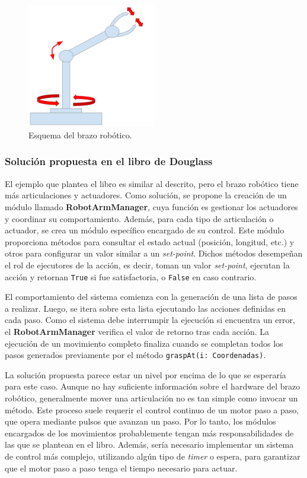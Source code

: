 \begin{figure}[h]
\caption{Esquema del brazo robótico.}
\begin{centering}
{\includegraphics[width=0.5\textwidth]{brazo2.png}\par}
\end{centering}
\end{figure}

\subsubsection*{Solución propuesta en el libro de Douglass}

El ejemplo que plantea el libro es similar al descrito, pero el brazo robótico tiene más articulaciones y actuadores. Como solución, se propone la creación de un módulo llamado \textbf{RobotArmManager}, cuya función es gestionar los actuadores y coordinar su comportamiento. Además, para cada tipo de articulación o actuador, se crea un módulo específico encargado de su control. Este módulo proporciona métodos para consultar el estado actual (posición, longitud, etc.) y otros para configurar un valor similar a un \textit{set-point}. Dichos métodos desempeñan el rol de ejecutores de la acción, es decir, toman un valor \textit{set-point}, ejecutan la acción y retornan \verb|True| si fue satisfactoria, o \verb|False| en caso contrario.

El comportamiento del sistema comienza con la generación de una lista de pasos a realizar. Luego, se itera sobre esta lista ejecutando las acciones definidas en cada paso. Como el sistema debe interrumpir la ejecución si encuentra un error, el \textbf{RobotArmManager} verifica el valor de retorno tras cada acción. La ejecución de un movimiento completo finaliza cuando se completan todos los pasos generados previamente por el método \verb|graspAt(i: Coordenadas)|.

La solución propuesta parece estar un nivel por encima de lo que se esperaría para este caso. Aunque no hay suficiente información sobre el hardware del brazo robótico, generalmente mover una articulación no es tan simple como invocar un método. Este proceso suele requerir el control continuo de un motor paso a paso, que opera mediante pulsos que avanzan un paso. Por lo tanto, los módulos encargados de los movimientos probablemente tengan más responsabilidades de las que se plantean en el libro. Además, sería necesario implementar un sistema de control más complejo, utilizando algún tipo de \textit{timer} o espera, para garantizar que el motor paso a paso tenga el tiempo necesario para actuar.

